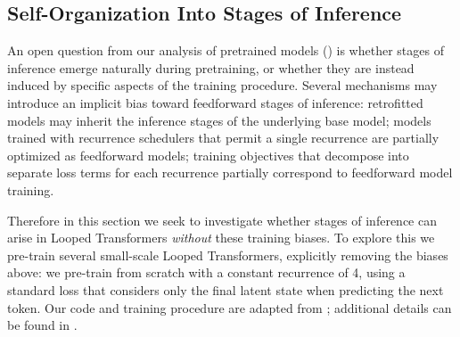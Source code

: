 \documentclass{article}
\theoremstyle{plain}
\theoremstyle{definition}
\theoremstyle{remark}
\begin{document}
\subsection{Self-Organization Into Stages of Inference}\label{sec:self_organising_soi}
An open question from our analysis of pretrained models () is whether stages of inference emerge naturally during pretraining, or whether they are instead induced by specific aspects of the training procedure. Several mechanisms may introduce an implicit bias toward feedforward stages of inference: retrofitted models \citep{mcleish2025teaching} may inherit the inference stages of the underlying base model; models trained with recurrence schedulers that permit a single recurrence \citep{geiping2025scaling,mcleish2025teaching} are partially optimized as feedforward models; training objectives that decompose into separate loss terms for each recurrence \citep{zhu2025scaling} partially correspond to feedforward model training.




Therefore in this section we seek to investigate whether stages of inference can arise in Looped Transformers \emph{without} these training biases. To explore this we pre-train several small-scale Looped Transformers, explicitly removing the biases above: we pre-train from scratch with a constant recurrence of 4, using a standard loss that considers only the final latent state when predicting the next token. Our code and training procedure are adapted from \citet{nanochat}; additional details can be found in .
\end{document}
